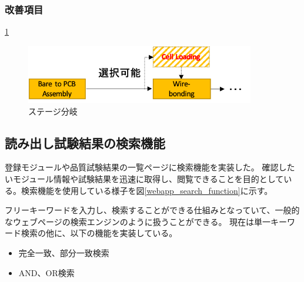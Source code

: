\subsubsection{改善項目}

\ref{stage_branching}
\begin{figure}[bpt]\centering
\includegraphics[width=10cm]{stage_branching}
\caption[ステージ分岐]{ステージ分岐}
\label{stage_branching}
\end{figure}

\newpage
\subsection{読み出し試験結果の検索機能}
登録モジュールや品質試験結果の一覧ページに検索機能を実装した。
確認したいモジュール情報や試験結果を迅速に取得し、閲覧できることを目的としている。検索機能を使用している様子を図\ref{webapp_search_function}に示す。

フリーキーワードを入力し、検索することができる仕組みとなっていて、一般的なウェブページの検索エンジンのように扱うことができる。
現在は単一キーワード検索の他に、以下の機能を実装している。
\begin{itemize}
  \item 完全一致、部分一致検索
  \item AND、OR検索
\end{itemize}


